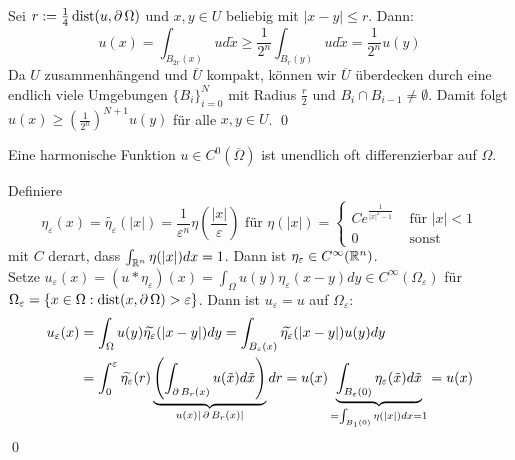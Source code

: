 	Sei $r := \frac{1}{4} \operatorname{dist}(u,\operatorname{\partial} \Omega)$ und $x,y \in U$ beliebig mit $|x-y| \leq r$. Dann:
	\[ u(x) = \int_{B_{2r}(x)} ud \tilde{x} \geq \frac{1}{2^n} \int_{B_r(y)} ud\tilde{x} = \frac{1}{2^n} u(y)\]
	Da $U$ zusammenhängend und $\overline{U}$ kompakt, können wir $\overline{U}$ überdecken durch eine endlich viele Umgebungen $\{B_i\}_{i = 0}^N$ mit Radius $\frac{r}{2}$ und $B_i \cap B_{i-1} \neq \emptyset$. Damit folgt $u(x) \geq \left( \frac{1}{2^n} \right)^{N+1} u(y)$ für alle $x,y \in U$. \qed
	
\begin{thm} \label{thm:glattheit_harm_fkt} \label{thm_42}
	Eine harmonische Funktion $u \in C^0(\overline{\Omega})$ ist unendlich oft differenzierbar auf $\Omega$. \marginnote{[42]}
\end{thm}
	
	Definiere 
	\[\eta_\varepsilon(x) = \widetilde{\eta_\varepsilon}(|x|) = \frac{1}{\varepsilon^n} \eta \left( \frac{|x|}{\varepsilon} \right) \text{ für } \eta(|x|)= \begin{cases}
		Ce^{\frac{1}{|x|^2-1}} & \text{ für } |x| < 1 \\
		0 & \text{ sonst} \end{cases} \]
	mit $C$ derart, dass $\int_{\mathbb{R}^n} \eta(|x|) dx = 1$. Dann ist $\eta_\varepsilon \in C^\infty(\mathbb{R}^n)$. \\
	Setze $u_\varepsilon(x) = (u * \eta_\varepsilon)(x) = \int_\Omega u(y) \eta_\varepsilon(x-y) dy \in C^\infty(\Omega_\varepsilon)$ für $\Omega_\varepsilon = \{x \in \Omega : \operatorname{dist}(x,\operatorname{\partial} \Omega) > \varepsilon\}$. Dann ist $u_\varepsilon = u$ auf $\Omega_\varepsilon$:
	\begin{equation}
	\begin{aligned}
		u_\varepsilon(x) &= \int_{\Omega} u(y) \widetilde{\eta_\varepsilon}(|x-y|)dy = \int_{B_\varepsilon(x)} \widetilde{\eta_\varepsilon} (|x-y|)u(y) dy \\ \notag
		&= \int_0^\varepsilon \widetilde{\eta_\varepsilon}(r) \underbrace{\left( \int_{\operatorname{\partial} B_r(x)} u(\tilde{x}) d \tilde{x} \right)}_{u(x) |\operatorname{\partial} B_r(x)|} dr = u(x) \underbrace{\int_{B_\varepsilon(0)} \eta_\varepsilon(\tilde{x}) d\tilde{x}}_{= \int_{B_1(0)} \eta(|x|) dx = 1} = u(x) 
	\end{aligned}
	\end{equation}
	\qed
	
